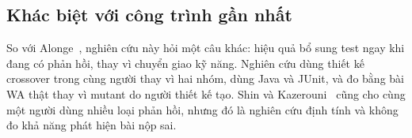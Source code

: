 \subsection{Khác biệt với công trình gần nhất}
So với Alonge~\cite{alonge2025}, nghiên cứu này hỏi một câu khác: hiệu quả bổ sung test ngay khi đang có phản hồi, thay vì chuyển giao kỹ năng. Nghiên cứu dùng thiết kế crossover trong cùng người thay vì hai nhóm, dùng Java và JUnit, và đo bằng bài WA thật thay vì mutant do người thiết kế tạo. Shin và Kazerouni~\cite{shin2024} cũng cho cùng một người dùng nhiều loại phản hồi, nhưng đó là nghiên cứu định tính và không đo khả năng phát hiện bài nộp sai.
